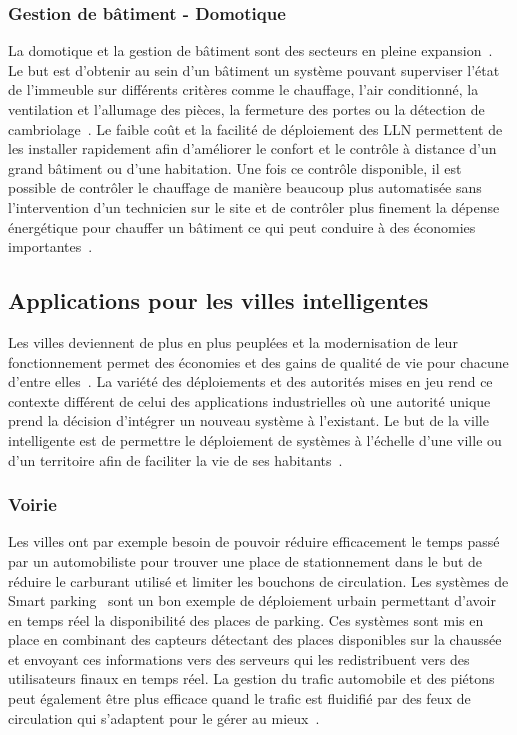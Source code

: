 \subsubsection{Gestion de bâtiment - Domotique}

La domotique et la gestion de bâtiment sont des secteurs en pleine expansion~\cite{martocci2010building, ehlers1996engery}.
Le but est d'obtenir au sein d'un bâtiment un système pouvant superviser l'état de l'immeuble sur différents critères comme le chauffage, l'air conditionné, la ventilation et l'allumage des pièces, la fermeture des portes ou la détection de cambriolage~\cite{mainwaring2002wireless}.
Le faible coût et la facilité de déploiement des \ac{LLN} permettent de les installer rapidement afin d'améliorer le confort et le contrôle à distance d'un grand bâtiment ou d'une habitation.
Une fois ce contrôle disponible, il est possible de contrôler le chauffage de manière beaucoup plus automatisée sans l'intervention d'un technicien sur le site et de contrôler plus finement la dépense énergétique pour chauffer un bâtiment ce qui peut conduire à des économies importantes~\cite{egan2005emergence}.

\subsection{Applications pour les villes intelligentes}

Les villes deviennent de plus en plus peuplées et la modernisation de leur fonctionnement permet des économies et des gains de qualité de vie pour chacune d'entre elles~\cite{caragliu2011smart}.
La variété des déploiements et des autorités mises en jeu rend ce contexte différent de celui des applications industrielles où une autorité unique prend la décision d'intégrer un nouveau système à l'existant.
Le but de la ville intelligente est de permettre le déploiement de systèmes à l'échelle d'une ville ou d'un territoire afin de faciliter la vie de ses habitants~\cite{hollands2008will}.

\subsubsection{Voirie}

Les villes ont par exemple besoin de pouvoir réduire efficacement le temps passé par un automobiliste pour trouver une place de stationnement dans le but de réduire le carburant utilisé  et limiter les bouchons de circulation.
Les systèmes de Smart parking~\cite{medaglianibringing} sont un bon exemple de déploiement urbain permettant d'avoir en temps réel la disponibilité des places de parking.
Ces systèmes sont mis en place en combinant des capteurs détectant des places disponibles sur la chaussée et envoyant ces informations vers des serveurs qui les redistribuent vers des utilisateurs finaux en temps réel.
La gestion du trafic automobile et des piétons peut également être plus efficace quand le trafic est fluidifié par des feux de circulation qui s'adaptent pour le gérer au mieux~\cite{de1998optimal,faye2012distributed}.

